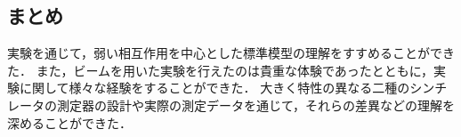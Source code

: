 \subsection{まとめ}
実験を通じて，弱い相互作用を中心とした標準模型の理解をすすめることができた．
また，ビームを用いた実験を行えたのは貴重な体験であったとともに，実験に関して様々な経験をすることができた．
大きく特性の異なる二種のシンチレータの測定器の設計や実際の測定データを通じて，それらの差異などの理解を深めることができた．
